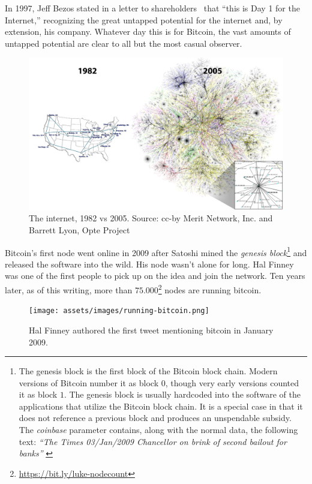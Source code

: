 In 1997, Jeff Bezos stated in a letter to shareholders~\cite{bezos-letter} that
\enquote{this is Day 1 for the Internet,} recognizing the great untapped
potential for the internet and, by extension, his company. Whatever day this is
for Bitcoin, the vast amounts of untapped potential are clear to all but the
most casual observer.

\begin{figure}
  \includegraphics[width=\textwidth]{assets/images/internet-evolution-white-dates.png}
  \caption{The internet, 1982 vs 2005. Source: cc-by Merit Network, Inc. and Barrett Lyon, Opte Project}
  \label{fig:internet-evolution-white-dates}
\end{figure}

Bitcoin's first node went online in 2009 after Satoshi mined the \textit{genesis
block}\footnote{The genesis block is the first block of the Bitcoin block chain.
Modern versions of Bitcoin number it as block $0$, though very early versions
counted it as block $1$. The genesis block is usually hardcoded into the
software of the applications that utilize the Bitcoin block chain. It is a
special case in that it does not reference a previous block and produces an
unspendable subsidy. The \textit{coinbase} parameter contains, along with the
normal data, the following text: \textit{\enquote{The Times 03/Jan/2009 Chancellor on
brink of second bailout for banks}} \cite{btcwiki:genesis-block}} and released
the software into the wild. His node wasn't alone for long. Hal Finney was one
of the first people to pick up on the idea and join the network. Ten years
later, as of this writing, more than
$75.000$\footnote{\url{https://bit.ly/luke-nodecount}} nodes are running
bitcoin.

\begin{figure}
  \centering
  \texttt{[image: assets/images/running-bitcoin.png]}
  \caption{Hal Finney authored the first tweet mentioning bitcoin in January 2009.}
  \label{fig:running-bitcoin}
\end{figure}

